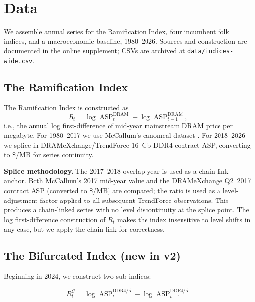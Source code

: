 \documentclass[12pt]{article}
\theoremstyle{definition}
\DeclareMathOperator{\ASP}{ASP}
\begin{document}
\section{Data}
\label{sec:data}

We assemble annual series for the Ramification Index, four incumbent folk indices, and a macroeconomic baseline, 1980--2026. Sources and construction are documented in the online supplement; CSVs are archived at \texttt{data/indices-wide.csv}.

\subsection{The Ramification Index}

The Ramification Index is constructed as
\begin{equation}
\label{eq:ram_index}
R_t = \log \ASP^{\text{DRAM}}_t - \log \ASP^{\text{DRAM}}_{t-1},
\end{equation}
i.e., the annual log first-difference of mid-year mainstream DRAM price per megabyte. For 1980--2017 we use McCallum's canonical dataset \cite{McCallum2024}. For 2018--2026 we splice in DRAMeXchange/TrendForce 16~Gb DDR4 contract ASP, converting to \$/MB for series continuity.

\textbf{Splice methodology.} The 2017--2018 overlap year is used as a chain-link anchor. Both McCallum's 2017 mid-year value and the DRAMeXchange Q2~2017 contract ASP (converted to \$/MB) are compared; the ratio is used as a level-adjustment factor applied to all subsequent TrendForce observations. This produces a chain-linked series with no level discontinuity at the splice point. The log first-difference construction of $R_t$ makes the index insensitive to level shifts in any case, but we apply the chain-link for correctness.

\subsection{The Bifurcated Index (new in v2)}
\label{subsec:bifurcated_data}

Beginning in 2024, we construct two sub-indices:

\begin{equation}
\label{eq:commodity_index}
R_t^C = \log \ASP^{\text{DDR4/5}}_t - \log \ASP^{\text{DDR4/5}}_{t-1}
\end{equation}
\end{document}

